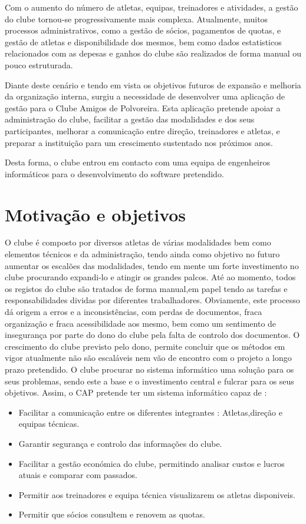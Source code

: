 \documentclass[a4paper,12pt]{scrreprt}
\begin{document}
Com o aumento do número de atletas, equipas, treinadores e atividades, a gestão do clube tornou-se progressivamente mais complexa. Atualmente, muitos processos administrativos, como a gestão de sócios, pagamentos de quotas, e gestão de atletas e disponibilidade dos mesmos, bem como dados estatisticos relacionados com as depesas e ganhos do clube  são realizados de forma manual ou pouco estruturada.

Diante deste cenário e tendo em vista os objetivos futuros de expansão e melhoria da organização interna, surgiu a necessidade de desenvolver uma aplicação de gestão para o Clube Amigos de Polvoreira. Esta aplicação pretende apoiar a administração do clube, facilitar a gestão das modalidades e dos seus participantes, melhorar a comunicação entre direção, treinadores e atletas, e preparar a instituição para um crescimento sustentado nos próximos anos.

Desta forma, o clube entrou em contacto com uma equipa de engenheiros informáticos para o desenvolvimento do software pretendido.

\section{Motivação e objetivos}
O clube é composto por diversos atletas de várias modalidades bem como elementos técnicos e da administração, tendo ainda como objetivo no futuro aumentar os escalões das modalidades, tendo em mente um forte investimento no clube procurando expandi-lo e atingir os grandes palcos.
Até ao momento, todos os registos do clube são tratados de forma manual,em papel tendo as tarefas e responsabilidades dividas por diferentes trabalhadores. Obviamente, este processo dá origem a erros e a inconsistências, com perdas de documentos, fraca organização e fraca acessibilidade aos mesmo, bem como um sentimento de insegurança por parte do dono do clube pela falta de controlo dos documentos.
O crescimento do clube previsto pelo dono, permite concluir que os métodos em vigor atualmente não são escaláveis nem vão de encontro com o projeto a longo prazo pretendido.
O clube procurar no sistema informático uma solução para os seus problemas, sendo este a base e o investimento central e fulcrar para os seus objetivos.
Assim, o CAP pretende ter um sistema informático capaz de :
\begin{itemize}
    \item Facilitar a comunicação entre os diferentes integrantes : Atletas,direção e equipas técnicas.
    \item Garantir segurança e controlo das informações do clube.
    \item Facilitar a gestão económica do clube, permitindo analisar custos e lucros atuais e comparar com passados.
    \item Permitir aos treinadores e equipa técnica visualizarem os atletas disponiveis.
    \item Permitir que sócios consultem e renovem as quotas.
\end{itemize}
\end{document}
